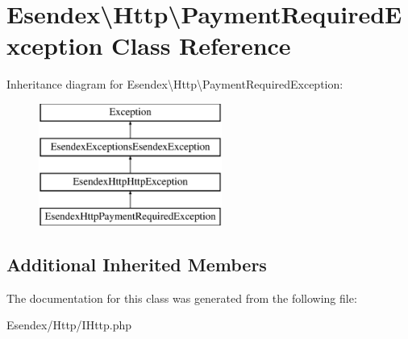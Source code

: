 \section{Esendex\textbackslash{}Http\textbackslash{}Payment\-Required\-Exception Class Reference}
\label{class_esendex_1_1_http_1_1_payment_required_exception}
Inheritance diagram for Esendex\textbackslash{}Http\textbackslash{}Payment\-Required\-Exception\-:\begin{figure}[H]
\begin{center}
\leavevmode
\includegraphics[height=4.000000cm]{class_esendex_1_1_http_1_1_payment_required_exception}
\end{center}
\end{figure}
\subsection*{Additional Inherited Members}


The documentation for this class was generated from the following file\-:\begin{DoxyCompactItemize}
\item 
Esendex/\-Http/I\-Http.\-php\end{DoxyCompactItemize}
